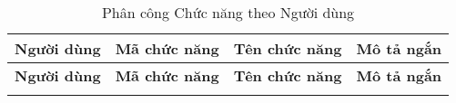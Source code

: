 \newpage %



\begin{longtable}{|m{2.5cm}|m{2.5cm}|m{5cm}|m{5cm}|}
	\caption{Phân công Chức năng theo Người dùng} \label{tab:user_function_map}                                                                                                                                                            \\
    \hline
	\textbf{Người dùng}                                     & \textbf{Mã chức năng} & \textbf{Tên chức năng}                                 & \textbf{Mô tả ngắn}                                                                         \\
	\hline
	\endfirsthead %
	
    \hline
	\textbf{Người dùng}                                     & \textbf{Mã chức năng} & \textbf{Tên chức năng}                                 & \textbf{Mô tả ngắn}                                                                         \\
	\hline
	\endhead %

	\midrule
	\endfoot %



\end{longtable}
